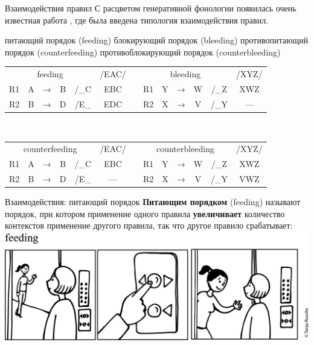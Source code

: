 \begin{frame}{Взаимодействия правил}
С расцветом генеративной фонологии появилась очень известная работа \citep{kiparsky71}, где была введена типология взаимодействия правил.
\begin{itemize}
\mytem питающий порядок (feeding)
\mytem блокирующий порядок (bleeding)
\mytem противопитающий порядок (counterfeeding)
\mytem противоблокирующий порядок (counterbleeding) 
\end{itemize}
\vfill
\begin{tabular}{ccccccccccccc}
\multicolumn{ 5}{c}{feeding} & /EAC/ &  & \multicolumn{ 5}{c}{bleeding} & /XYZ/ \\ 
R1 & A & → & B & /\_C & EBC &  & R1 & Y & → & W & /\_Z & XWZ \\ 
R2 & B & → & D & /E\_ & EDC &  & R2 & X & → & V & /\_Y & — \\ 
\end{tabular}
\bigskip\\ 
\begin{tabular}{ccccccccccccc}
\multicolumn{ 5}{c}{counterfeeding} & /EAC/ &  & \multicolumn{ 5}{c}{counterbleeding} & /XYZ/ \\ 
R1 & A & → & B & /\_C & EBC &  & R1 & Y & → & W & /\_Z & XWZ \\ 
R2 & B & → & D & /E\_ & —  &  & R2 & X & → & V & /\_Y & VWZ \\ 
\end{tabular}
\end{frame}

\begin{frame}{Взаимодействия: питающий порядок}
\textbf{Питающим порядком} (feeding) называют порядок, при котором применение одного правила \textbf{увеличивает} количество контекстов применение другого правила, так что другое правило срабатывает:\\
\vfill
\includegraphics[width=\linewidth]{Russita-feeding.png}
\end{frame}

